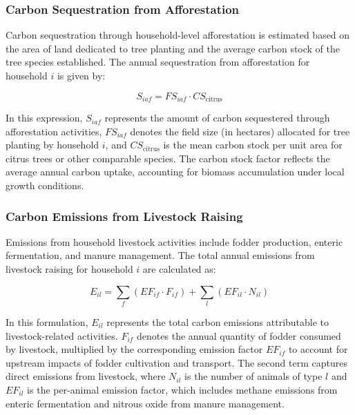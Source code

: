 \documentclass[12pt,a4paper]{article}%
\begin{document}
\subsubsection{Carbon Sequestration from Afforestation}

Carbon sequestration through household-level afforestation is estimated based on the area of land dedicated to tree planting and the average carbon stock of the tree species established. The annual sequestration from afforestation for household $i$ is given by:

\begin{equation}
S_{iaf} = FS_{iaf} \cdot CS_{\text{citrus}}
\end{equation}

In this expression, $S_{iaf}$ represents the amount of carbon sequestered through afforestation activities, $FS_{iaf}$ denotes the field size (in hectares) allocated for tree planting by household $i$, and $CS_{\text{citrus}}$ is the mean carbon stock per unit area for citrus trees or other comparable species. The carbon stock factor reflects the average annual carbon uptake, accounting for biomass accumulation under local growth conditions.


\subsubsection{Carbon Emissions from Livestock Raising}

Emissions from household livestock activities include fodder production, enteric fermentation, and manure management. The total annual emissions from livestock raising for household $i$ are calculated as:

\begin{equation}
E_{il} = \sum_f (EF_{if} \cdot F_{if}) + \sum_l (EF_{il} \cdot N_{il})
\end{equation}

In this formulation, $E_{il}$ represents the total carbon emissions attributable to livestock-related activities. $F_{if}$ denotes the annual quantity of fodder consumed by livestock, multiplied by the corresponding emission factor $EF_{if}$ to account for upstream impacts of fodder cultivation and transport. The second term captures direct emissions from livestock, where $N_{il}$ is the number of animals of type $l$ and $EF_{il}$ is the per-animal emission factor, which includes methane emissions from enteric fermentation and nitrous oxide from manure management.
\end{document}

